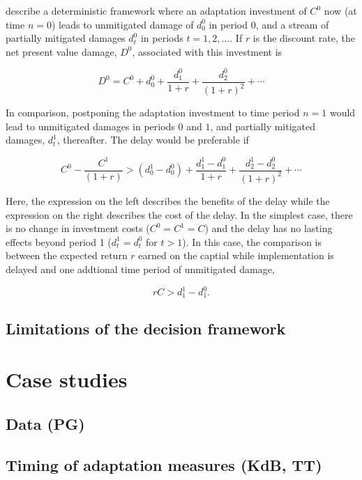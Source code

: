 \documentclass[wrr, draft]{agutex}
\begin{document}
\begin{article}
\cite{Fankhauser&1999} describe a deterministic framework where an adaptation investment of $C^0$ now (at time $n=0$) leads to unmitigated damage of $d_0^0$ in period $0$, and a stream of partially mitigated damages $d_t^0$ in periods $t=1,2,\ldots$. If $r$ is the discount rate, the net present value damage, $D^0$, associated with this investment is
\begin{linenomath*}
\begin{equation}\label{eq:deterministic damage}
D^0 = C^0 + d_0^0 + \frac{d_1^0}{1+r} + \frac{d_2^0}{(1+r)^2} + \cdots  
\end{equation}
\end{linenomath*}
In comparison, postponing the adaptation investment to time period $n=1$ would lead to unmitigated damages in periods $0$ and $1$, and partially mitigated damages, $d_t^1$, thereafter. The delay would be preferable if
\begin{linenomath*}
\[
C^0 - \frac{C^1}{(1+r)} > (d_0^1 - d_0^0) + \frac{d_1^1 - d_1^0}{1+r} + \frac{d_2^1 - d_2^0}{(1+r)^2} + \cdots
\]
\end{linenomath*}
Here, the expression on the left describes the benefits of the delay while the expression on the right describes the cost of the delay. In the simplest case, there is no change in investment costs ($C^0 = C^1 = C$) and the delay has no lasting effects beyond period 1 ($d_t^1 = d_t^0$ for $t > 1$). In this case, the comparison is between the expected return $r$ earned on the captial while implementation is delayed and one addtional time period of unmitigated damage,
\begin{linenomath*}
  \[
  r C > d_1^1 - d_1^0.
  \]
  \end{linenomath*}

\subsection{Limitations of the decision framework}

\section{Case studies}

\subsection{Data {\color{blue} (PG)}}

\subsection{Timing of adaptation measures {\color{blue} (KdB, TT)}}


\end{article}
\end{document}
